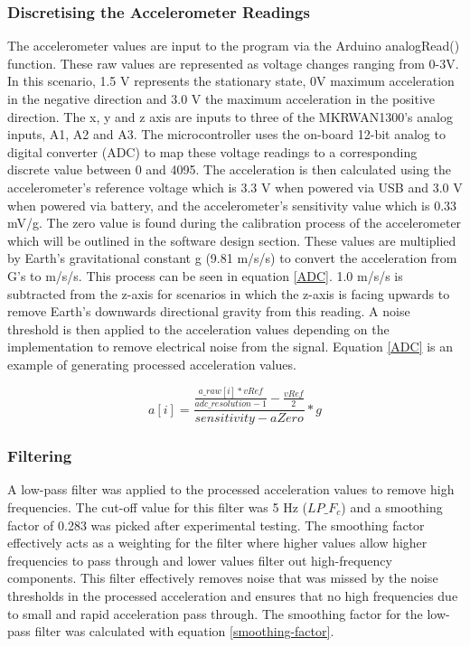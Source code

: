 \subsubsection{Discretising the Accelerometer Readings}
The accelerometer values are input to the program via the Arduino analogRead() function. These raw values are represented as voltage changes ranging from 0-3V. In this scenario, 1.5 V represents the stationary state, 0V maximum acceleration in the negative direction and 3.0 V the maximum acceleration in the positive direction. The x, y and z axis are inputs to three of the MKRWAN1300's analog inputs, A1, A2 and A3. The microcontroller uses the on-board 12-bit analog to digital converter (ADC) to map these voltage readings to a corresponding discrete value between 0 and 4095. The acceleration is then calculated using the accelerometer's reference voltage which is 3.3 V when powered via USB and 3.0 V when powered via battery, and the accelerometer's sensitivity value which is 0.33 mV/g. The zero value is found during the calibration process of the accelerometer which will be outlined in the software design section. These values are multiplied by Earth's gravitational constant g (9.81 m/s/s) to convert the acceleration from G's to m/s/s. This process can be seen in equation \ref{ADC}. 1.0 m/s/s is subtracted from the z-axis for scenarios in which the z-axis is facing upwards to remove Earth's downwards directional gravity from this reading. A noise threshold is then applied to the acceleration values depending on the implementation to remove electrical noise from the signal. Equation \ref{ADC} is an example of generating processed acceleration values. 

\begin{equation} \label{ADC}
a[i] = \frac{\frac{a\_raw[i] * vRef}{adc\_resolution - 1} - \frac{vRef}{2}} {sensitivity - aZero} * g
\end{equation}

\subsubsection{Filtering}
A low-pass filter was applied to the processed acceleration values to remove high frequencies. The cut-off value for this filter was 5 Hz ($LP\_F_c$) and a smoothing factor of 0.283 was picked after experimental testing. The smoothing factor effectively acts as a weighting for the filter where higher values allow higher frequencies to pass through and lower values filter out high-frequency components. This filter effectively removes noise that was missed by the noise thresholds in the processed acceleration and ensures that no high frequencies due to small and rapid acceleration pass through. The smoothing factor for the low-pass filter was calculated with equation \ref{smoothing-factor}. 

